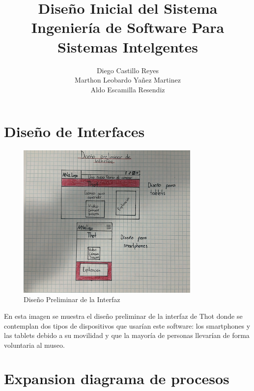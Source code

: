 \documentclass{report}
\title{\Huge{\textbf{Diseño Inicial del Sistema}}\\
\Large{\textbf{Ingeniería de Software Para Sistemas Intelgentes}}}
\author{Diego Castillo Reyes\\Marthon Leobardo Yañez Martinez\\Aldo Escamilla Resendiz}
\begin{document}
\maketitle

\section{Diseño de Interfaces}
    \begin{figure}[H]
        \centering
        \includegraphics[width=0.8\textwidth]{DisenioPreliminar.jpeg}
        \caption{Diseño Preliminar de la Interfaz}
    \end{figure}
    En esta imagen se muestra el diseño preliminar de la interfaz de Thot donde se 
    contemplan dos tipos de dispositivos que usarían este software: los smartphones y las tablets
    debido a su movilidad y que la mayoría de personas llevarían de forma voluntaria al museo.
    
    \section{Expansion diagrama de procesos}
\end{document}
